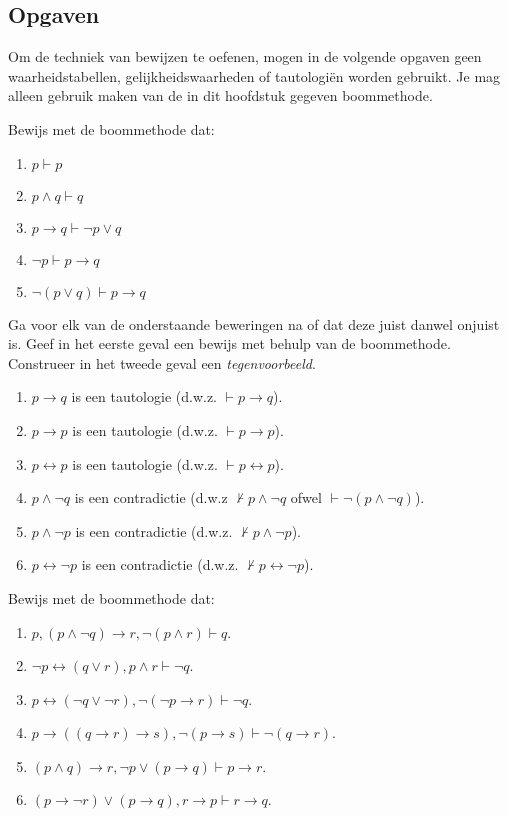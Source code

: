 \subsection{Opgaven}
Om de techniek van bewijzen te oefenen, mogen in de volgende opgaven geen waarheidstabellen, gelijkheidswaarheden of tautologi\"en worden gebruikt. Je mag alleen gebruik maken van de in dit hoofdstuk gegeven boommethode.

\begin{exercise}
Bewijs met de boommethode dat:
\begin{enumerate}[label=\textit{\alph*.}]
\item $p\vdash p$
\item $p\wedge q\vdash q$
\item $p\rightarrow q\vdash \neg p\vee q$
\item $\neg p\vdash p\rightarrow q$
\item $\neg(p\vee q)\vdash p\rightarrow q$
\end{enumerate}
\end{exercise}
\begin{exercise} Ga voor elk van de onderstaande beweringen na of dat deze juist danwel onjuist is. Geef in het eerste geval een bewijs met behulp van de boommethode. Construeer in het tweede geval een \textit{tegenvoorbeeld}.
\begin{enumerate}[label=\textit{\alph*.}]
\item $p\rightarrow q$ is een tautologie (d.w.z. $\vdash p\rightarrow q$).
\item $p\rightarrow p$ is een tautologie (d.w.z. $\vdash p\rightarrow p$).
\item $p\leftrightarrow p$ is een tautologie (d.w.z. $\vdash p\leftrightarrow p$).
\item $p\wedge\neg q$ is een contradictie (d.w.z $\not\vdash p\wedge\neg q$ ofwel $\vdash\neg(p\wedge\neg q)$).
\item $p\wedge\neg p$ is een contradictie (d.w.z. $\not\vdash p\wedge\neg p$).
\item $p\leftrightarrow\neg p$ is een contradictie (d.w.z. $\not\vdash p\leftrightarrow\neg p$).
\end{enumerate}
\end{exercise}
\begin{exercise} Bewijs met de boommethode dat:
\begin{enumerate}[label=\textit{\alph*.}]
\item $p, (p\land\neg q)\rightarrow r, \neg (p\land r)\vdash q$.
\item $\neg p\leftrightarrow(q\lor r), p\land r\vdash\neg q$.
\item $p\leftrightarrow(\neg q\lor\neg r), \neg(\neg p\rightarrow r)\vdash \neg q$.
\item $p\rightarrow((q\rightarrow r)\rightarrow s), \neg(p\rightarrow s)\vdash\neg(q\rightarrow r)$.
\item $(p\land q)\rightarrow r,\neg p\lor(p\rightarrow q)\vdash p\rightarrow r$.
\item $(p\rightarrow\neg r)\lor(p\rightarrow q), r\rightarrow p\vdash r\rightarrow q$.
\end{enumerate}
\end{exercise}
